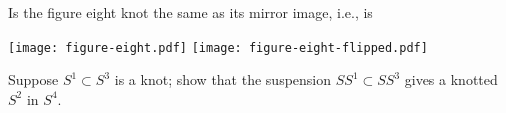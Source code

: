 \documentclass[12pt]{pset}
\begin{document}
\begin{problem}
 Is the figure eight knot the same as its mirror image, i.e., is
 \begin{center}
   \texttt{[image: figure-eight.pdf]}\hspace{0.5em}\raisebox{0.05\textwidth}{the same as}\hspace{0.5em}%
   \texttt{[image: figure-eight-flipped.pdf]}\raisebox{0.05\textwidth}{?}
 \end{center}
\end{problem}

\begin{problem}
  Suppose $S^1 \subset S^3$ is a knot; show that the suspension $SS^1
  \subset SS^3$ gives a knotted $S^2$ in $S^4$.
\end{problem}
\end{document}
